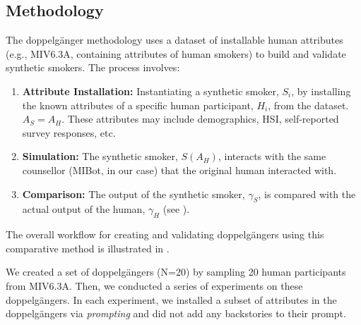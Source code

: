 \subsection{Methodology}
The doppelgänger methodology uses a dataset of installable human attributes (e.g., MIV6.3A, containing attributes of human smokers) to build and validate synthetic smokers. The process involves:

\begin{enumerate}
    \item \textbf{Attribute Installation:} Instantiating a synthetic smoker, $S_i$, by installing the known attributes of a specific human participant, $H_i$, from the dataset. $A_S = A_H$. These attributes may include demographics, HSI, self-reported survey responses, etc.
    \item \textbf{Simulation:} The synthetic smoker, $S(A_H)$, interacts with the same counsellor (MIBot, in our case) that the original human interacted with.
    \item \textbf{Comparison:} The output of the synthetic smoker, $\gamma_S$, is compared with the actual output of the human, $\gamma_H$ (see ).
\end{enumerate}



The overall workflow for creating and validating doppelgängers using this comparative method is illustrated in .



We created a set of doppelgängers (N=20) by sampling 20 human participants from MIV6.3A. Then, we conducted a series of experiments on these doppelgängers. In each experiment, we installed a subset of attributes in the doppelgängers via \emph{prompting} and did not add any backstories to their prompt.



